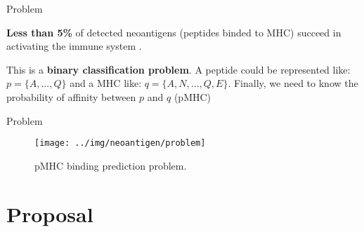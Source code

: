 \documentclass[10pt]{beamer}
\newcommand{\1}{
	\setbeamertemplate{background}{
		\texttt{[image: img/1]}
		\tikz[overlay] \fill[fill opacity=0.75,fill=white] (0,0) rectangle (-\paperwidth,\paperheight);
	}
}
\begin{document}
	\begin{frame}{Problem}{}
		
		\begin{block}{}
			\textbf{Less than 5\%} of detected neoantigens (peptides binded to MHC) succeed in activating the immune system \cite{de2020neoantigen}.
		\end{block}
		
		
		\begin{block}{}
			This is a \textbf{binary classification problem}. A peptide could be represented like: $p = \{ A, ... , Q \}$ and a MHC like: $q = \{ A, N, ... ,Q, E \}$. Finally, we need to know the probability of affinity between $p$ and $q$ (pMHC)
		\end{block}
		
		
	\end{frame}
	
	\begin{frame}{Problem}{}	
		\begin{figure}
			\texttt{[image: ../img/neoantigen/problem]}
			\caption{pMHC binding prediction problem.}
		\end{figure}
	\end{frame}
	

	
	\section{Proposal}
	
\end{document}

